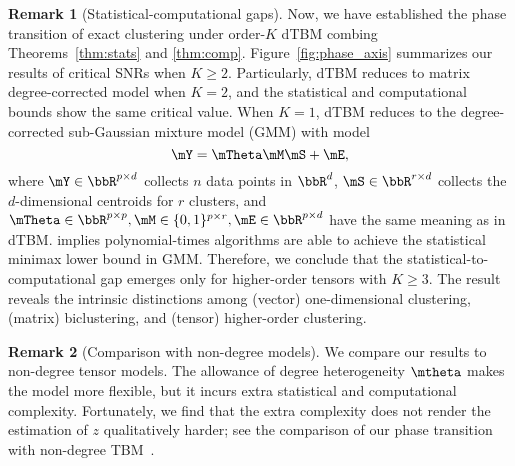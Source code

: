 \documentclass[lettersize,onecolumn,journal]{IEEEtran}
\theoremstyle{definition}
\theoremstyle{definition}
\newtheorem{rmk}{Remark}
\def\fixme#1#2{\textbf{\color{red}[FIXME (#1): #2]}}
\begin{document}
\begin{rmk}[Statistical-computational gaps]
Now, we have established the phase transition of exact clustering under order-$K$ dTBM combing Theorems~\ref{thm:stats} and \ref{thm:comp}. Figure~\ref{fig:phase_axis} summarizes our results of critical SNRs when $K \geq 2$. Particularly, dTBM reduces to matrix degree-corrected model when $K =2$, and the statistical and computational bounds show the same critical value. When $K =1$, dTBM reduces to the degree-corrected sub-Gaussian mixture model (GMM) with model
\begin{equation}
    \mY = \mTheta \mM \mS + \mE,
\end{equation}
where $\mY \in \bbR^{p \times d}$ collects $n$ data points in $\bbR^d$, $\mS \in \bbR^{r \times d}$ collects the $d$-dimensional centroids for $r$ clusters, and $\mTheta \in \bbR^{p \times p}, \mM \in \{0,1\}^{p \times r}, \mE \in \bbR^{p \times d}$ have the same meaning as in dTBM. \cite{lu2016statistical} implies polynomial-times algorithms are able to achieve the statistical minimax lower bound in GMM. Therefore, we conclude that the statistical-to-computational gap emerges only for higher-order tensors with $K \geq 3$. The result reveals the intrinsic distinctions among (vector) one-dimensional clustering, (matrix) biclustering, and (tensor) higher-order clustering. 
\end{rmk}


\begin{rmk}[Comparison with non-degree models]
We compare our results to non-degree tensor models. 
The allowance of degree heterogeneity $\mtheta$ makes the model more flexible, but it incurs extra statistical and computational complexity. Fortunately, we find that the extra complexity does not render the estimation of $z$ qualitatively harder; see the comparison of our phase transition with non-degree TBM~\citep{han2020exact}. 
\end{rmk}
\end{document}

